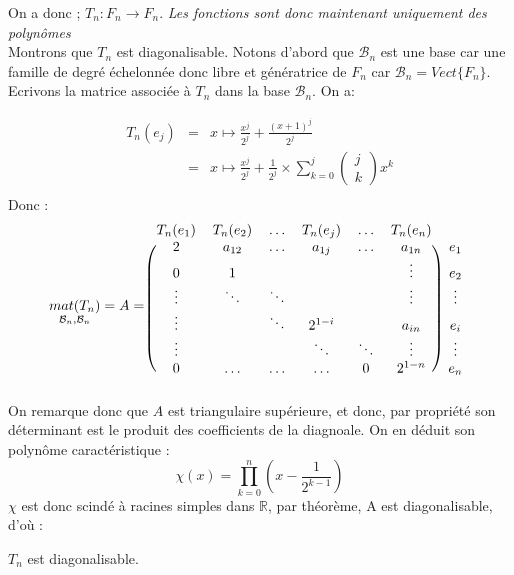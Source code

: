 On a donc ; $T_n : F_n \rightarrow F_n$. \textit{Les fonctions sont donc maintenant uniquement des polynômes}\\
Montrons que $T_n$ est diagonalisable.
Notons d'abord que $\mathcal{B}_n$ est une base car une famille de degré échelonnée donc libre et génératrice de $F_n$ car $\mathcal{B}_n = Vect\{F_n\}$.
Ecrivons la matrice associée à $T_n$ dans la base $\mathcal{B}_n$. On a:

\[
  \begin{array}{rcl}
    T_{n}(e_j) & = & x \mapsto \frac{x^j}{2^j} + \frac{(x+1)^j}{2^j}  \\
               & = & x \mapsto \frac{x^j}{2^j} + \frac{1}{2^j} \times
    \sum\limits_{k=0}^{j}
    \left(
    \begin{array}{c}
        j \\
        k
      \end{array}
    \right) x^k
    \\
  \end{array}
\]
Donc :
\[
  \underset{\mathcal{B}_n, \mathcal{B}_n}{mat(T_n)} = A =
  \begin{blockarray}{ccccccc}
    T_n(e_1) & T_n(e_2) & \dots &T_n(e_j) & \dots & T_n(e_n) \\
    \begin{block}{(cccccc)c}
      2       & a_{12}  & \dots   & a_{1j}  & \dots   & a_{1n}  & e_1     \\
      0       & 1       & ~       & ~       & ~       & \vdots  & e_2     \\
      \vdots  & \ddots  & \ddots  & ~       & ~       & \vdots  & \vdots  \\
      \vdots  & ~       & \ddots  & 2^{1-i} & ~       & a_{in}  & e_i     \\
      \vdots  & ~       & ~       & \ddots  & \ddots  & \vdots  & \vdots  \\
      0       & \dots   & \dots   & \dots   & 0       & 2^{1-n} &  e_n    \\
    \end{block}
  \end{blockarray}
\] On remarque donc que $A$ est triangulaire supérieure, et donc, par propriété son déterminant est le produit des coefficients de la diagnoale. On en déduit son polynôme caractéristique :
\[
  \chi(x) = \prod_{k=0}^{n} \left(x-\frac{1}{2^{k-1}}\right)
\]
$\chi$ est donc scindé à racines simples dans $\mathbb{R}$, par théorème, A est diagonalisable, d'où :
\begin{result}
  $T_n$ est diagonalisable.
\end{result}
